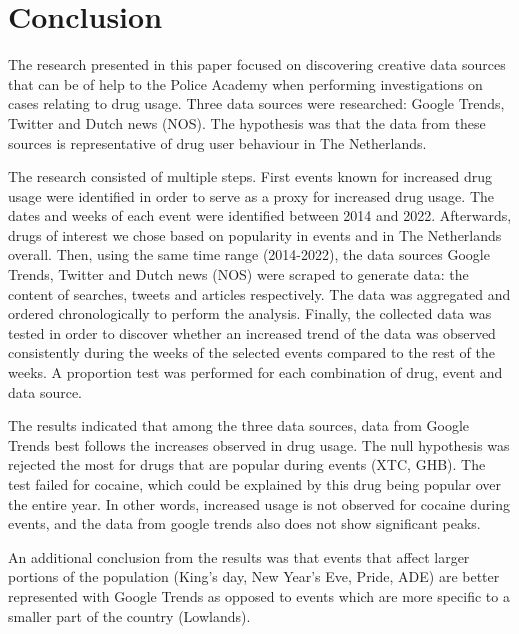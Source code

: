 \section{Conclusion}
The research presented in this paper focused on discovering creative data sources that can be of help to the Police Academy when performing investigations on cases relating to drug usage. Three data sources were researched: Google Trends, Twitter and Dutch news (NOS). The hypothesis was that the data from these sources is representative of drug user behaviour in The Netherlands.

The research consisted of multiple steps. First events known for increased drug usage were identified in order to serve as a proxy for increased drug usage. The dates and weeks of each event were identified between 2014 and 2022. Afterwards, drugs of interest we chose based on popularity in events and in The Netherlands overall. Then, using the same time range (2014-2022), the data sources Google Trends, Twitter and Dutch news (NOS) were scraped to generate data: the content of searches, tweets  and articles respectively. The data was aggregated and ordered chronologically to perform the analysis. Finally, the collected data was tested in order to discover whether an increased trend of the data was observed consistently during the weeks of the selected events compared to the rest of the weeks. A proportion test was performed for each combination of drug, event and data source. 

The results indicated that among the three data sources, data from Google Trends best follows the increases observed in drug usage. The null hypothesis was rejected the most for drugs that are popular during events (XTC, GHB). The test failed for cocaine, which could be explained by this drug being popular over the entire year. In other words, increased usage is not observed for cocaine during events, and the data from google trends also does not show significant peaks. 

An additional conclusion from the results was that events that affect larger portions of the population (King’s day, New Year’s Eve, Pride, ADE) are better represented with Google Trends as opposed to events which are more specific to a smaller part of the country (Lowlands). 
